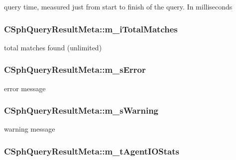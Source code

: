 query time, measured just from start to finish of the query. In milliseconds 

\hypertarget{classCSphQueryResultMeta_aa212bc7b1148d610d6aca616ddd14d4b}{
\subsubsection[{m\-\_\-i\-Total\-Matches}]{ C\-Sph\-Query\-Result\-Meta\-::m\-\_\-i\-Total\-Matches}}\label{classCSphQueryResultMeta_aa212bc7b1148d610d6aca616ddd14d4b}


total matches found (unlimited) 

\hypertarget{classCSphQueryResultMeta_a62ab7fe3b8010c9c709143b1a7cd0165}{
\subsubsection[{m\-\_\-s\-Error}]{ C\-Sph\-Query\-Result\-Meta\-::m\-\_\-s\-Error}}\label{classCSphQueryResultMeta_a62ab7fe3b8010c9c709143b1a7cd0165}


error message 

\hypertarget{classCSphQueryResultMeta_a1efcc451fcdba2ae16e3828aab626cb6}{
\subsubsection[{m\-\_\-s\-Warning}]{ C\-Sph\-Query\-Result\-Meta\-::m\-\_\-s\-Warning}}\label{classCSphQueryResultMeta_a1efcc451fcdba2ae16e3828aab626cb6}


warning message 

\hypertarget{classCSphQueryResultMeta_a75b36f1d4101ee5c04eed34a84ac9e34}{
\subsubsection[{m\-\_\-t\-Agent\-I\-O\-Stats}]{ C\-Sph\-Query\-Result\-Meta\-::m\-\_\-t\-Agent\-I\-O\-Stats}}\label{classCSphQueryResultMeta_a75b36f1d4101ee5c04eed34a84ac9e34}


